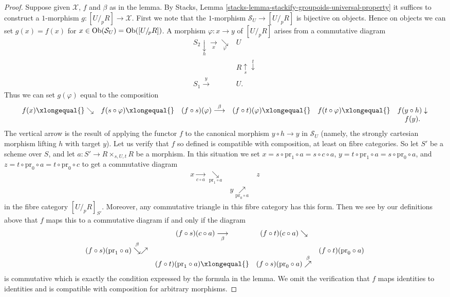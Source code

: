\begin{proof}
Suppose given $\mathcal{X}$, $f$ and $\beta$ as in the lemma. By
Stacks, Lemma \ref{stacks-lemma-stackify-groupoids-universal-property}
it suffices to construct a $1$-morphism $g : [U/_{\!p}R] \to \mathcal{X}$.
First we note that the $1$-morphism
$\mathcal{S}_U \to [U/_{\!p}R]$ is bijective on objects.
Hence on objects we can set $g(x) = f(x)$ for
$x \in \operatorname{Ob}(\mathcal{S}_U) = \operatorname{Ob}([U/_{\!p}R])$.
A morphism $\varphi : x \to y$ of $[U/_{\!p}R]$ arises from a
commutative diagram
$$
\begin{array}{cc}S_2 \underset{h}{\downarrow}\underset{x}{\longrightarrow}\underset{\varphi}{\searrow} & U \\  & R \underset{s}{\uparrow}\overset{t}{\downarrow} \\ S_1 \overset{y}{\longrightarrow} & U.\end{array}
$$
Thus we can set $g(\varphi)$ equal to the composition
$$
\begin{array}{cccccc}f(x) \xlongequal{}\searrow & f(s \circ \varphi) \xlongequal{} & (f \circ s)(\varphi) \overset{\beta}{\longrightarrow} & (f \circ t)(\varphi) \xlongequal{} & f(t \circ \varphi) \xlongequal{} & f(y \circ h) \downarrow \\  &  &  &  &  & f(y).\end{array}
$$
The vertical arrow is the result of applying the functor $f$ to the
canonical morphism $y \circ h \to y$ in $\mathcal{S}_U$ (namely, the
strongly cartesian morphism lifting $h$ with target $y$).
Let us verify that $f$ so defined is compatible with composition, at least
on fibre categories. So let $S'$ be a scheme over $S$, and let
$a : S' \to R \times_{s, U, t} R$ be a morphism. In this situation
we set $x = s \circ \text{pr}_1 \circ a = s \circ c \circ a$,
$y = t \circ \text{pr}_1 \circ a = s \circ \text{pr}_0 \circ a$, and
$z = t \circ \text{pr}_0 \circ a = t \circ \text{pr}_0 \circ c$ to
get a commutative diagram
$$
\begin{array}{ccc}x \underset{c \circ a}{\longrightarrow}\underset{\text{pr}_1 \circ a}{\searrow} &  & z \\  & y \underset{\text{pr}_0 \circ a}{\nearrow} & \end{array}
$$
in the fibre category $[U/_{\!p}R]_{S'}$. Moreover, any commutative
triangle in this fibre category has this form. Then we see by our definitions
above that $f$ maps this to a commutative diagram if and only if
the diagram
$$
\begin{array}{cccc} & (f \circ s)(c \circ a) \underset{\beta}{\longrightarrow} & (f \circ t)(c \circ a) \searrow &  \\ (f \circ s)(\text{pr}_1 \circ a) \overset{\beta}{\searrow}\nearrow &  &  & (f \circ t)(\text{pr}_0 \circ a) \\  & (f \circ t)(\text{pr}_1 \circ a) \xlongequal{} & (f \circ s)(\text{pr}_0 \circ a) \overset{\beta}{\nearrow} & \end{array}
$$
is commutative which is exactly the condition expressed by the formula
in the lemma. We omit the
verification that $f$ maps identities to identities and is compatible
with composition for arbitrary morphisms.
\end{proof}

